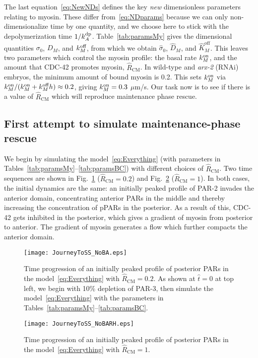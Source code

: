 \documentclass[11pt]{article}
\newcommand{\6}[1]{#1_{\text{6}}}
\newcommand{\3}[1]{#1_{\text{3}}}
\begin{document}
The last equation\ \eqref{eq:NewNDs} defines the key \emph{new} dimensionless parameters relating to myosin. These differ from\ \eqref{eq:NDparams} because we can only non-dimensionalize time by one quantity, and we choose here to stick with the depolymerization time $1/k^\text{dp}_A$. Table\ \ref{tab:paramsMy} gives the dimensional quantities ${\sigma}_0$, $D_M$, and $k^\text{off}_M$, from which we obtain $\hat \sigma_0$, $\hat D_M$, and $\hat K^\text{off}_M$. This leaves two parameters which control the myosin profile: the basal rate $k^\text{on}_M$, and the amount that CDC-42 promotes myosin, $\hat R_\text{CM}$. In wild-type and \emph{arx-2} (RNAi) embryos, the minimum amount of bound myosin is 0.2. This sets $k^\text{on}_M$ via $k^\text{on}_M/(k^\text{on}_M+k^\text{off}_M h) \approx 0.2$, giving $k^\text{on}_M=0.3$ $\mu$m/s. Our task now is to see if there is a value of $\hat R_\text{CM}$ which will reproduce maintenance phase rescue.

\subsection{First attempt to simulate maintenance-phase rescue}
We begin by simulating the model\ \eqref{eq:Everything} (with parameters in Tables\ \ref{tab:paramsMy}--\ref{tab:paramsBC}) with different choices of $\hat R_\text{CM}$. Two time sequences are shown in Fig.\ \ref{fig:TimeSeqNoBA} ($\hat R_\text{CM}=0.2$) and Fig.\ \ref{fig:TimeSeqNoBARH} ($\hat R_\text{CM}=1$). In both cases, the initial dynamics are the same: an initially peaked profile of PAR-2 invades the anterior domain, concentrating anterior PARs in the middle and thereby increasing the concentration of pPARs in the posterior. As a result of this, CDC-42 gets inhibited in the posterior, which gives a gradient of myosin from posterior to anterior. The gradient of myosin generates a flow which further compacts the anterior domain.


\begin{figure}
\centering
\texttt{[image: JourneyToSS\_NoBA.eps]}
\caption{\label{fig:TimeSeqNoBA} Time progression of an initially peaked profile of posterior PARs in the model\ \eqref{eq:Everything} with $\hat R_\text{CM}=0.2$. As shown at $\hat t=0$ at top left, we begin with 10\% depletion of PAR-3, then simulate the model\ \eqref{eq:Everything} with the parameters in Tables\ \ref{tab:paramsMy}--\ref{tab:paramsBC}.}
\end{figure}

\begin{figure}
\centering
\texttt{[image: JourneyToSS\_NoBARH.eps]}
\caption{\label{fig:TimeSeqNoBARH} Time progression of an initially peaked profile of posterior PARs in the model\ \eqref{eq:Everything} with $\hat R_\text{CM}=1$. }
\end{figure}
\end{document}
